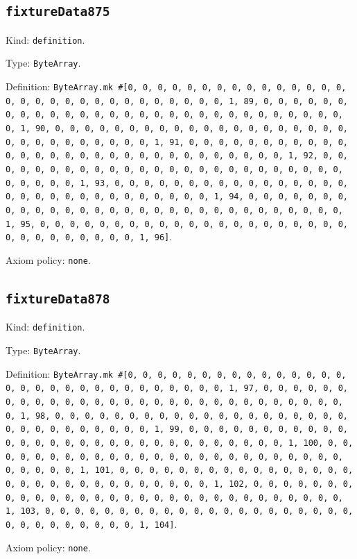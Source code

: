 \documentclass[11pt]{article}
\begin{document}
\subsection*{\texttt{fixtureData875}}
\noindent Kind: \texttt{definition}.\par
\noindent Type: \texttt{ByteArray}.\par
\noindent Definition: \texttt{ByteArray.mk \#[0, 0, 0, 0, 0, 0, 0, 0, 0, 0, 0, 0, 0, 0, 0, 0, 0, 0, 0, 0, 0, 0, 0, 0, 0, 0, 0, 0, 0, 0, 1, 89, 0, 0, 0, 0, 0, 0, 0, 0, 0, 0, 0, 0, 0, 0, 0, 0, 0, 0, 0, 0, 0, 0, 0, 0, 0, 0, 0, 0, 0, 0, 1, 90, 0, 0, 0, 0, 0, 0, 0, 0, 0, 0, 0, 0, 0, 0, 0, 0, 0, 0, 0, 0, 0, 0, 0, 0, 0, 0, 0, 0, 0, 0, 1, 91, 0, 0, 0, 0, 0, 0, 0, 0, 0, 0, 0, 0, 0, 0, 0, 0, 0, 0, 0, 0, 0, 0, 0, 0, 0, 0, 0, 0, 0, 0, 1, 92, 0, 0, 0, 0, 0, 0, 0, 0, 0, 0, 0, 0, 0, 0, 0, 0, 0, 0, 0, 0, 0, 0, 0, 0, 0, 0, 0, 0, 0, 0, 1, 93, 0, 0, 0, 0, 0, 0, 0, 0, 0, 0, 0, 0, 0, 0, 0, 0, 0, 0, 0, 0, 0, 0, 0, 0, 0, 0, 0, 0, 0, 0, 1, 94, 0, 0, 0, 0, 0, 0, 0, 0, 0, 0, 0, 0, 0, 0, 0, 0, 0, 0, 0, 0, 0, 0, 0, 0, 0, 0, 0, 0, 0, 0, 1, 95, 0, 0, 0, 0, 0, 0, 0, 0, 0, 0, 0, 0, 0, 0, 0, 0, 0, 0, 0, 0, 0, 0, 0, 0, 0, 0, 0, 0, 0, 0, 1, 96]}.\par
\noindent Axiom policy: \texttt{none}.\par
\subsection*{\texttt{fixtureData878}}
\noindent Kind: \texttt{definition}.\par
\noindent Type: \texttt{ByteArray}.\par
\noindent Definition: \texttt{ByteArray.mk \#[0, 0, 0, 0, 0, 0, 0, 0, 0, 0, 0, 0, 0, 0, 0, 0, 0, 0, 0, 0, 0, 0, 0, 0, 0, 0, 0, 0, 0, 0, 1, 97, 0, 0, 0, 0, 0, 0, 0, 0, 0, 0, 0, 0, 0, 0, 0, 0, 0, 0, 0, 0, 0, 0, 0, 0, 0, 0, 0, 0, 0, 0, 1, 98, 0, 0, 0, 0, 0, 0, 0, 0, 0, 0, 0, 0, 0, 0, 0, 0, 0, 0, 0, 0, 0, 0, 0, 0, 0, 0, 0, 0, 0, 0, 1, 99, 0, 0, 0, 0, 0, 0, 0, 0, 0, 0, 0, 0, 0, 0, 0, 0, 0, 0, 0, 0, 0, 0, 0, 0, 0, 0, 0, 0, 0, 0, 1, 100, 0, 0, 0, 0, 0, 0, 0, 0, 0, 0, 0, 0, 0, 0, 0, 0, 0, 0, 0, 0, 0, 0, 0, 0, 0, 0, 0, 0, 0, 0, 1, 101, 0, 0, 0, 0, 0, 0, 0, 0, 0, 0, 0, 0, 0, 0, 0, 0, 0, 0, 0, 0, 0, 0, 0, 0, 0, 0, 0, 0, 0, 0, 1, 102, 0, 0, 0, 0, 0, 0, 0, 0, 0, 0, 0, 0, 0, 0, 0, 0, 0, 0, 0, 0, 0, 0, 0, 0, 0, 0, 0, 0, 0, 0, 1, 103, 0, 0, 0, 0, 0, 0, 0, 0, 0, 0, 0, 0, 0, 0, 0, 0, 0, 0, 0, 0, 0, 0, 0, 0, 0, 0, 0, 0, 0, 0, 1, 104]}.\par
\noindent Axiom policy: \texttt{none}.\par
\end{document}
